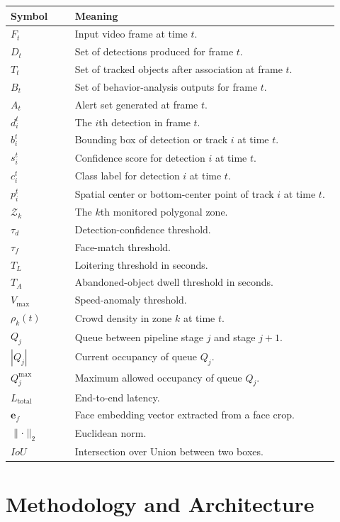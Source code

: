 \documentclass[11pt]{article}
\begin{document}
\begin{longtable}{p{0.18\linewidth}p{0.74\linewidth}}
\toprule
Symbol & Meaning \\
\midrule
\endhead
$F_t$ & Input video frame at time $t$. \\
$D_t$ & Set of detections produced for frame $t$. \\
$T_t$ & Set of tracked objects after association at frame $t$. \\
$B_t$ & Set of behavior-analysis outputs for frame $t$. \\
$A_t$ & Alert set generated at frame $t$. \\
$d_i^t$ & The $i$th detection in frame $t$. \\
$b_i^t$ & Bounding box of detection or track $i$ at time $t$. \\
$s_i^t$ & Confidence score for detection $i$ at time $t$. \\
$c_i^t$ & Class label for detection $i$ at time $t$. \\
$p_i^t$ & Spatial center or bottom-center point of track $i$ at time $t$. \\
$\mathcal{Z}_k$ & The $k$th monitored polygonal zone. \\
$\tau_d$ & Detection-confidence threshold. \\
$\tau_f$ & Face-match threshold. \\
$T_L$ & Loitering threshold in seconds. \\
$T_A$ & Abandoned-object dwell threshold in seconds. \\
$V_{\max}$ & Speed-anomaly threshold. \\
$\rho_k(t)$ & Crowd density in zone $k$ at time $t$. \\
$Q_j$ & Queue between pipeline stage $j$ and stage $j+1$. \\
$|Q_j|$ & Current occupancy of queue $Q_j$. \\
$Q_j^{\max}$ & Maximum allowed occupancy of queue $Q_j$. \\
$L_{\text{total}}$ & End-to-end latency. \\
$\mathbf{e}_f$ & Face embedding vector extracted from a face crop. \\
$\lVert \cdot \rVert_2$ & Euclidean norm. \\
$IoU$ & Intersection over Union between two boxes. \\
\bottomrule
\end{longtable}

\section{Methodology and Architecture}
\end{document}

